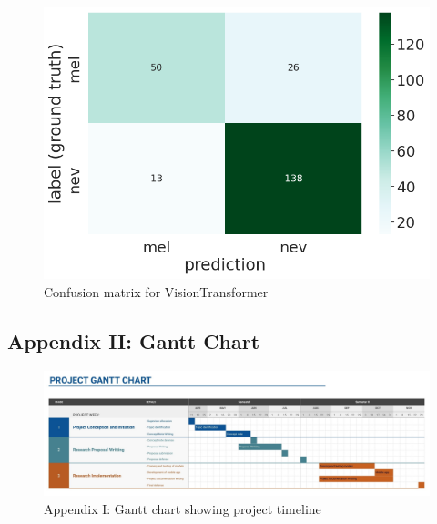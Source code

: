 \documentclass[12pt, a4paper]{article}
\begin{document}
\begin{figure}[h]
    \centering
    \setlength{\fboxsep}{8pt}
    \includegraphics[scale=0.5, fbox]{images/matrix-vit.png}
    \caption{Confusion matrix for VisionTransformer}
    \label{fig:matrix-vit}
\end{figure}
\clearpage
\begin{landscape}
\thispagestyle{empty}
\subsection*{Appendix II: Gantt Chart}
\begin{figure}[h]
    \centering
     \includegraphics[scale=0.34]{gantt.jpg}
    \caption*{Appendix I: Gantt chart showing project timeline}
\end{figure}
\vfill
\raisebox{0pt}{\makebox[\linewidth]{\thepage}}
\end{landscape}
\end{document}
